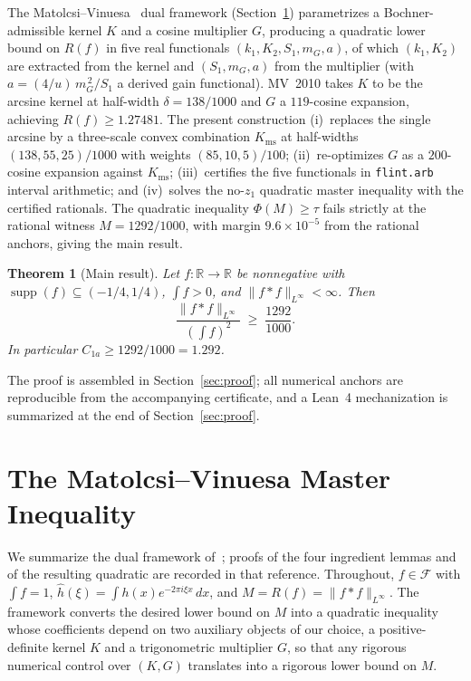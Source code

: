 \documentclass[11pt, letterpaper]{article}
\theoremstyle{paperplain}
\newtheorem{theorem}{Theorem}[section]
\theoremstyle{paperdef}
\newcommand{\R}{\mathbb{R}}
\newcommand{\Linf}{L^\infty}
\newcommand{\supp}{\operatorname{supp}}
\newcommand{\Kms}{K_{\mathrm{ms}}}
\begin{document}
The Matolcsi--Vinuesa~\cite{MV10} dual framework
(Section~\ref{sec:mv}) parametrizes a Bochner-admissible kernel $K$ and
a cosine multiplier $G$, producing a quadratic lower bound on $R(f)$
in five real functionals $(k_1,K_2,S_1,m_G,a)$, of which $(k_1,K_2)$
are extracted from the kernel and $(S_1,m_G,a)$ from the multiplier
(with $a=(4/u)\,m_G^{\,2}/S_1$ a derived gain functional).  MV~2010 takes $K$ to
be the arcsine kernel at half-width $\delta=138/1000$ and $G$ a
$119$-cosine expansion, achieving $R(f)\ge 1.27481$.  The present
construction (i)~replaces the single arcsine by a three-scale convex
combination $\Kms$ at half-widths $(138,55,25)/1000$ with weights
$(85,10,5)/100$; (ii)~re-optimizes $G$ as a $200$-cosine expansion
against $\Kms$; (iii)~certifies the five functionals in
\texttt{flint.arb} interval arithmetic; and (iv)~solves the no-$z_1$
quadratic master inequality with the certified rationals.  The
quadratic inequality $\Phi(M)\ge\tau$ fails strictly at the rational
witness $M=1292/1000$, with margin $9.6\times 10^{-5}$ from the
rational anchors, giving the main result.

\begin{theorem}[Main result]
\label{thm:main}
Let $f:\R\to\R$ be nonnegative with
$\supp(f)\subseteq(-1/4,1/4)$, $\int f>0$, and
$\|f*f\|_{\Linf}<\infty$.  Then
\[
  \frac{\|f*f\|_{\Linf}}{\left(\int f\right)^2}
  \;\ge\;
  \frac{1292}{1000}.
\]
In particular $C_{1a}\ge 1292/1000=1.292$.
\end{theorem}

The proof is assembled in Section~\ref{sec:proof}; all numerical
anchors are reproducible from the accompanying certificate, and a
Lean~4 mechanization is summarized at the end of
Section~\ref{sec:proof}.

\section{The Matolcsi--Vinuesa Master Inequality}\label{sec:mv}

We summarize the dual framework of~\cite[\S 3]{MV10}; proofs of the
four ingredient lemmas and of the resulting quadratic are recorded
in that reference.  Throughout, $f\in\mathcal{F}$ with $\int f=1$,
$\widehat{h}(\xi)=\int h(x)e^{-2\pi i\xi x}\,dx$, and
$M=R(f)=\|f*f\|_{\Linf}$.  The framework converts the desired lower
bound on $M$ into a quadratic inequality whose coefficients depend on
two auxiliary objects of our choice, a positive-definite kernel $K$
and a trigonometric multiplier $G$, so that any rigorous numerical
control over $(K,G)$ translates into a rigorous lower bound on $M$.
\end{document}
